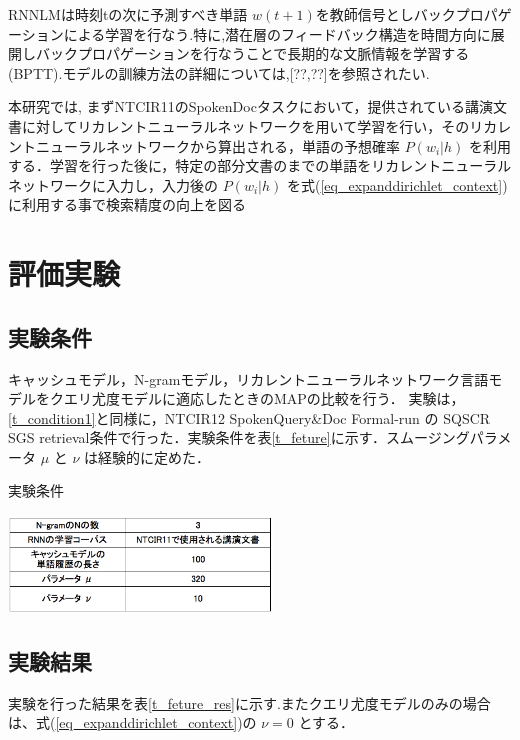 
RNNLMは時刻tの次に予測すべき単語 $w(t+1)$を教師信号としバックプロパゲーションによる学習を行なう.特に,潜在層のフィードバック構造を時間方向に展開しバックプロパゲーションを行なうことで長期的な文脈情報を学習する(BPTT).モデルの訓練方法の詳細については,[??,??]を参照されたい.

本研究では, まずNTCIR11のSpokenDocタスクにおいて，提供されている講演文書に対してリカレントニューラルネットワークを用いて学習を行い，そのリカレントニューラルネットワークから算出される，単語の予想確率 $P(w_i|h)$ を利用する．学習を行った後に，特定の部分文書のまでの単語をリカレントニューラルネットワークに入力し，入力後の $P(w_i|h)$ を式(\ref{eq_expanddirichlet_context})に利用する事で検索精度の向上を図る

\section{評価実験}
\subsection{実験条件}

キャッシュモデル，N-gramモデル，リカレントニューラルネットワーク言語モデルをクエリ尤度モデルに適応したときのMAPの比較を行う．
実験は，\ref{t_condition1}と同様に，NTCIR12 SpokenQuery\&Doc Formal-run の SQSCR SGS retrieval条件で行った．実験条件を表\ref{t_feture}に示す．スムージングパラメータ $\mu$ と $\nu$ は経験的に定めた．

\begin{table}[h]
    \centering
    \caption{実験条件}
    \includegraphics[width=7cm]{./image/t_feature1.png}
    \label{t_feture}
\end{table}

\subsection{実験結果}

実験を行った結果を表\ref{t_feture_res}に示す.またクエリ尤度モデルのみの場合は、式(\ref{eq_expanddirichlet_context})の $\nu = 0$ とする．

